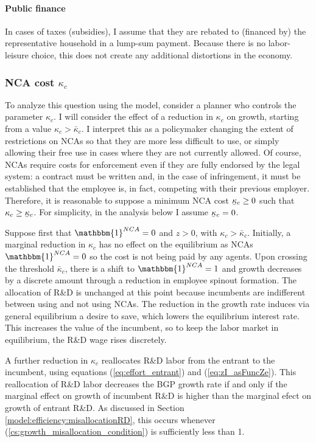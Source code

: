 \documentclass[11pt,english]{article}
\newcommand\munderbar[1]{%
	\underaccent{\bar}{#1}}
\theoremstyle{definition}
\begin{document}
\paragraph{Public finance} 

In cases of taxes (subsidies), I assume that they are rebated to (financed by) the representative household in a lump-sum payment. Because there is no labor-leisure choice, this does not create any additional distortions in the economy.

\subsubsection{NCA cost $\kappa_c$}\label{subsubsec:ncacost}

To analyze this question using the model, consider a planner who controls the parameter $\kappa_c$. I will consider the effect of a reduction in $\kappa_c$ on growth, starting from a value $\kappa_c > \bar{\kappa}_c$. I interpret this as a policymaker changing the extent of restrictions on NCAs so that they are more less difficult to use, or simply allowing their free use in cases where they are not currently allowed. Of course, NCAs require costs for enforcement even if they are fully endorsed by the legal system: a contract must be written and, in the case of infringement, it must be established that the employee is, in fact, competing with their previous employer. Therefore, it is reasonable to suppose a minimum NCA cost $\munderbar{\kappa}_c \ge 0$ such that $\kappa_c \ge \munderbar{\kappa}_c$. For simplicity, in the analysis below I assume $\munderbar{\kappa}_c = 0$.

Suppose first that $\mathbbm{1}^{NCA} = 0$ and $z > 0$, with $\kappa_c > \bar{\kappa}_c$. Initially, a marginal reduction in $\kappa_c$ has no effect on the equilibrium as NCAs $\mathbbm{1}^{NCA} = 0$ so the cost is not being paid by any agents. Upon crossing the threshold $\bar{\kappa}_c$, there is a shift to $\mathbbm{1}^{NCA} = 1$ and growth decreases by a discrete amount through a reduction in employee spinout formation. The allocation of R\&D is unchanged at this point because incumbents are indifferent between using and not using NCAs. The reduction in the growth rate induces via general equilibrium a desire to save, which lowers the equilibrium interest rate. This increases the value of the incumbent, so to keep the labor market in equilibrium, the R\&D wage rises discretely.

A further reduction in $\kappa_c$ reallocates R\&D labor from the entrant to the incumbent, using equations (\ref{eq:effort_entrant}) and (\ref{eq:zI_asFuncZe}). This reallocation of R\&D labor decreases the BGP growth rate if and only if the marginal effect on growth of incumbent R\&D is higher than the marginal efect on growth of entrant R\&D. As discussed in Section \ref{model:efficiency:misallocationRD}, this occurs whenever (\ref{cs:growth_misallocation_condition}) is sufficiently less than 1. 
\end{document}
